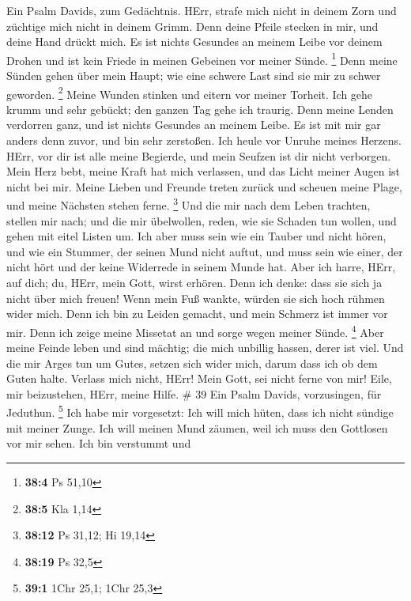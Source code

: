  Ein Psalm Davids, zum Gedächtnis.  HErr, strafe
mich nicht in deinem Zorn und züchtige mich nicht in deinem Grimm.
 Denn deine Pfeile stecken in mir, und deine Hand drückt
mich.  Es ist nichts Gesundes an meinem Leibe vor deinem
Drohen und ist kein Friede in meinen Gebeinen vor meiner Sünde.
\footnote{\textbf{38:4} Ps 51,10}  Denn meine Sünden gehen
über mein Haupt; wie eine schwere Last sind sie mir zu schwer geworden.
\footnote{\textbf{38:5} Kla 1,14}  Meine Wunden stinken und
eitern vor meiner Torheit.  Ich gehe krumm und sehr gebückt;
den ganzen Tag gehe ich traurig.  Denn meine Lenden
verdorren ganz, und ist nichts Gesundes an meinem Leibe.  Es
ist mit mir gar anders denn zuvor, und bin sehr zerstoßen. Ich heule vor
Unruhe meines Herzens.  HErr, vor dir ist alle meine
Begierde, und mein Seufzen ist dir nicht verborgen.  Mein
Herz bebt, meine Kraft hat mich verlassen, und das Licht meiner Augen
ist nicht bei mir.  Meine Lieben und Freunde treten zurück
und scheuen meine Plage, und meine Nächsten stehen ferne. \footnote{\textbf{38:12}
  Ps 31,12; Hi 19,14}  Und die mir nach dem Leben trachten,
stellen mir nach; und die mir übelwollen, reden, wie sie Schaden tun
wollen, und gehen mit eitel Listen um.  Ich aber muss sein
wie ein Tauber und nicht hören, und wie ein Stummer, der seinen Mund
nicht auftut,  und muss sein wie einer, der nicht hört und
der keine Widerrede in seinem Munde hat.  Aber ich harre,
HErr, auf dich; du, HErr, mein Gott, wirst erhören.  Denn
ich denke: dass sie sich ja nicht über mich freuen! Wenn mein Fuß
wankte, würden sie sich hoch rühmen wider mich.  Denn ich
bin zu Leiden gemacht, und mein Schmerz ist immer vor mir. 
Denn ich zeige meine Missetat an und sorge wegen meiner Sünde.
\footnote{\textbf{38:19} Ps 32,5}  Aber meine Feinde leben
und sind mächtig; die mich unbillig hassen, derer ist viel.
 Und die mir Arges tun um Gutes, setzen sich wider mich,
darum dass ich ob dem Guten halte.  Verlass mich nicht,
HErr! Mein Gott, sei nicht ferne von mir!  Eile, mir
beizustehen, HErr, meine Hilfe. \# 39  Ein Psalm Davids,
vorzusingen, für Jeduthun. \footnote{\textbf{39:1} 1Chr 25,1; 1Chr 25,3}
 Ich habe mir vorgesetzt: Ich will mich hüten, dass ich
nicht sündige mit meiner Zunge. Ich will meinen Mund zäumen, weil ich
muss den Gottlosen vor mir sehen.  Ich bin verstummt und

